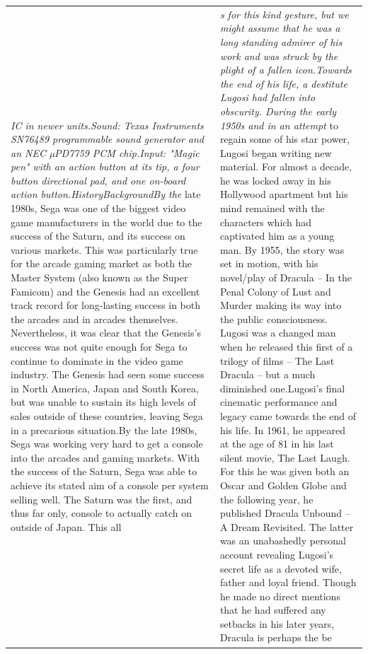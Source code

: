 \documentclass{article}
\begin{document}
\begin{table}[t]
\begin{center}
\begin{tabular}{|p{8cm}|p{8cm}|}
\hline
\textit{IC in newer units.\newline{}Sound: Texas Instruments SN76489 programmable sound generator and an NEC µPD7759 PCM chip.\newline{}Input: "Magic pen" with an action button at its tip, a four button directional pad, and one on-board action button.\newline{}History\newline{}Background\newline{}By the} late 1980s, Sega was one of the biggest video game manufacturers in the world due to the success of the Saturn, and its success on various markets. This was particularly true for the arcade gaming market as both the Master System (also known as the Super Famicom) and the Genesis had an excellent track record for long-lasting success in both the arcades and in arcades themselves. Nevertheless, it was clear that the Genesis's success was not quite enough for Sega to continue to dominate in the video game industry. The Genesis had seen some success in North America, Japan and South Korea, but was unable to sustain its high levels of sales outside of these countries, leaving Sega in a precarious situation.\newline{}By the late 1980s, Sega was working very hard to get a console into the arcades and gaming markets. With the success of the Saturn, Sega was able to achieve its stated aim of a console per system selling well. The Saturn was the first, and thus far only, console to actually catch on outside of Japan. This all &
\textit{s for this kind gesture, but we might assume that he was a long standing admirer of his work and was struck by the plight of a fallen icon.\newline{}Towards the end of his life, a destitute Lugosi had fallen into obscurity. During the early 1950s and in an attempt} to regain some of his star power, Lugosi began writing new material. For almost a decade, he was locked away in his Hollywood apartment but his mind remained with the characters which had captivated him as a young man. By 1955, the story was set in motion, with his novel/play of Dracula – In the Penal Colony of Lust and Murder making its way into the public consciousness. Lugosi was a changed man when he released this first of a trilogy of films – The Last Dracula – but a much diminished one.\newline{}Lugosi's final cinematic performance and legacy came towards the end of his life. In 1961, he appeared at the age of 81 in his last silent movie, The Last Laugh. For this he was given both an Oscar and Golden Globe and the following year, he published Dracula Unbound – A Dream Revisited. The latter was an unabashedly personal account revealing Lugosi's secret life as a devoted wife, father and loyal friend. Though he made no direct mentions that he had suffered any setbacks in his later years, Dracula is perhaps the be \\

\end{tabular}
\end{center}
\end{table}
\end{document}
